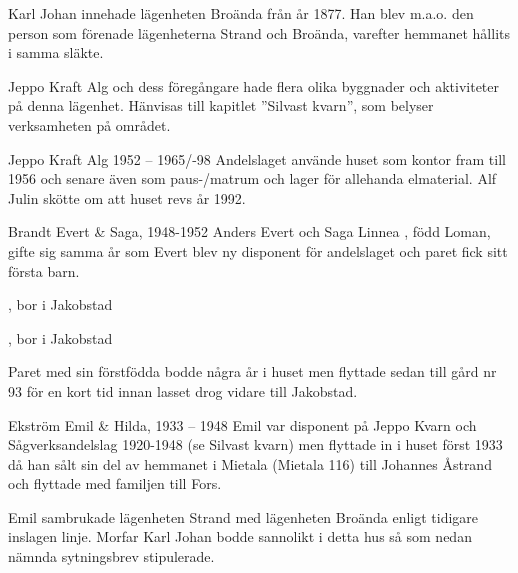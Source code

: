 Karl Johan innehade lägenheten Broända från år 1877. Han blev m.a.o. den person som förenade lägenheterna Strand och Broända, varefter hemmanet hållits i samma släkte.










Jeppo Kraft Alg och dess föregångare hade flera olika byggnader och aktiviteter på denna lägenhet. Hänvisas till kapitlet ”Silvast kvarn”, som belyser verksamheten på området.

Jeppo Kraft Alg
1952 – 1965/-98
Andelslaget använde huset som kontor fram till 1956 och senare även som paus-/matrum och lager för allehanda elmaterial. Alf Julin skötte om att huset revs år 1992.

Brandt Evert \& Saga, 1948-1952
Anders Evert  och Saga Linnea , född Loman, gifte sig samma år som Evert blev ny disponent för andelslaget och paret fick sitt första barn.
\begin{jhchildren}
  \item {}, bor i Jakobstad
  \item {}, bor i Jakobstad
\end{jhchildren}

Paret med sin förstfödda bodde några år i huset men flyttade sedan till gård nr 93 för en kort tid innan lasset drog vidare till Jakobstad.

Ekström Emil \& Hilda, 1933 – 1948
Emil var disponent på Jeppo Kvarn och Sågverksandelslag 1920-1948 (se Silvast kvarn) men flyttade in i huset först 1933 då han sålt sin del av hemmanet i Mietala (Mietala 116) till Johannes Åstrand och flyttade med familjen till Fors.



Emil sambrukade lägenheten Strand med lägenheten Broända enligt tidigare inslagen linje. Morfar Karl Johan bodde sannolikt i detta hus så som nedan nämnda sytningsbrev stipulerade.



